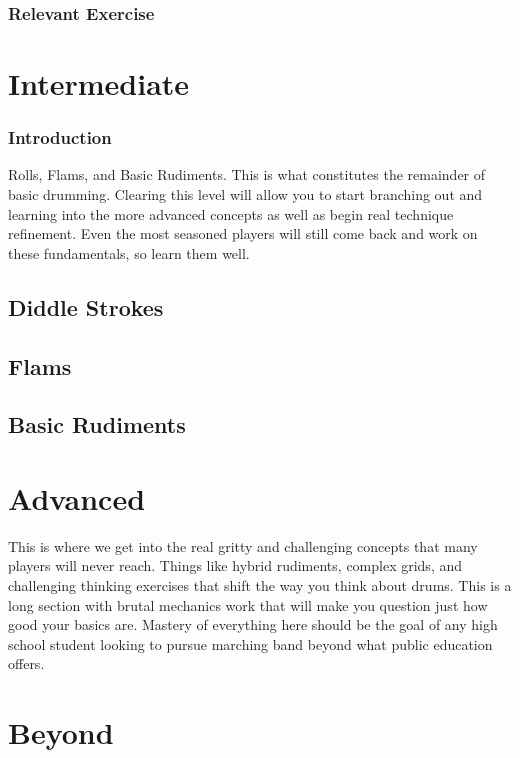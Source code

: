 \documentclass[12pt,letterpaper]{book}
\begin{document}
\section{Relevant Exercise}







\part{Intermediate}


\section{Introduction}
Rolls, Flams, and Basic Rudiments. This is what constitutes the remainder of basic drumming. Clearing this level will allow you to start branching out and learning into the more advanced concepts as well as begin real technique refinement. Even the most seasoned players will still come back and work on these fundamentals, so learn them well.


\chapter{Diddle Strokes}

\chapter{Flams}

\chapter{Basic Rudiments}


\part{Advanced}

This is where we get into the real gritty and challenging concepts that many players will never reach.  Things like hybrid rudiments, complex grids, and challenging thinking exercises that shift the way you think about drums.  This is a long section with brutal mechanics work that will make you question just how good your basics are.  Mastery of everything here should be the goal of any high school student looking to pursue marching band beyond what public education offers.

\part{Beyond}
\end{document}
